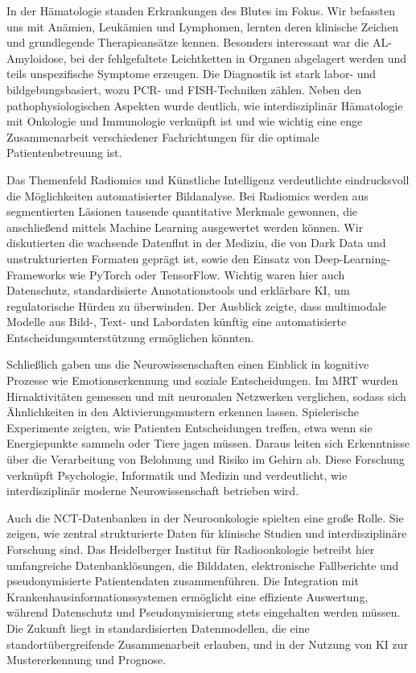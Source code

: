 \documentclass{article}
\begin{document}
In der Hämatologie standen Erkrankungen des Blutes im Fokus. Wir befassten uns mit Anämien, Leukämien und Lymphomen, lernten deren klinische Zeichen und grundlegende Therapieansätze kennen. Besonders interessant war die AL-Amyloidose, bei der fehlgefaltete Leichtketten in Organen abgelagert werden und teils unspezifische Symptome erzeugen. Die Diagnostik ist stark labor- und bildgebungsbasiert, wozu PCR- und FISH-Techniken zählen. Neben den pathophysiologischen Aspekten wurde deutlich, wie interdisziplinär Hämatologie mit Onkologie und Immunologie verknüpft ist und wie wichtig eine enge Zusammenarbeit verschiedener Fachrichtungen für die optimale Patientenbetreuung ist.

Das Themenfeld Radiomics und Künstliche Intelligenz verdeutlichte eindrucksvoll die Möglichkeiten automatisierter Bildanalyse. Bei Radiomics werden aus segmentierten Läsionen tausende quantitative Merkmale gewonnen, die anschließend mittels Machine Learning ausgewertet werden können. Wir diskutierten die wachsende Datenflut in der Medizin, die von Dark Data und unstrukturierten Formaten geprägt ist, sowie den Einsatz von Deep-Learning-Frameworks wie PyTorch oder TensorFlow. Wichtig waren hier auch Datenschutz, standardisierte Annotationstools und erklärbare KI, um regulatorische Hürden zu überwinden. Der Ausblick zeigte, dass multimodale Modelle aus Bild-, Text- und Labordaten künftig eine automatisierte Entscheidungsunterstützung ermöglichen könnten.


Schließlich gaben uns die Neurowissenschaften einen Einblick in kognitive Prozesse wie Emotionserkennung und soziale Entscheidungen. Im MRT wurden Hirnaktivitäten gemessen und mit neuronalen Netzwerken verglichen, sodass sich Ähnlichkeiten in den Aktivierungsmustern erkennen lassen. Spielerische Experimente zeigten, wie Patienten Entscheidungen treffen, etwa wenn sie Energiepunkte sammeln oder Tiere jagen müssen. Daraus leiten sich Erkenntnisse über die Verarbeitung von Belohnung und Risiko im Gehirn ab. Diese Forschung verknüpft Psychologie, Informatik und Medizin und verdeutlicht, wie interdisziplinär moderne Neurowissenschaft betrieben wird.

Auch die NCT-Datenbanken in der Neuroonkologie spielten eine große Rolle. Sie zeigen, wie zentral strukturierte Daten für klinische Studien und interdisziplinäre Forschung sind. Das Heidelberger Institut für Radioonkologie betreibt hier umfangreiche Datenbanklösungen, die Bilddaten, elektronische Fallberichte und pseudonymisierte Patientendaten zusammenführen. Die Integration mit Krankenhausinformationssystemen ermöglicht eine effiziente Auswertung, während Datenschutz und Pseudonymisierung stets eingehalten werden müssen. Die Zukunft liegt in standardisierten Datenmodellen, die eine standortübergreifende Zusammenarbeit erlauben, und in der Nutzung von KI zur Mustererkennung und Prognose.
\end{document}
